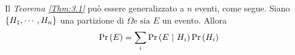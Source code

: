 \documentclass{subfiles}
\begin{document}
Il \emph{Teorema \ref{Thm:3.1}} può essere generalizzato a \(n\) eventi, come segue.
Siano \(\Set{H_{1}, \cdots, H_{n}}\) una partizione di \(\Omega \text{e sia } E\) un evento.
Allora
\[
    \Prob{E} = \Sum{\Prob{E}[H_{i}] \Prob{H_{i}}}{i}
\]
\end{document}
